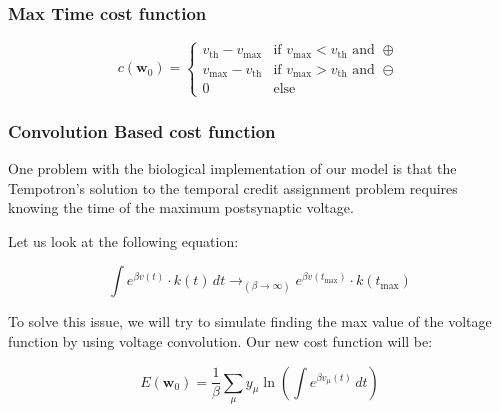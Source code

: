 \subsubsection{Max Time cost function}

\begin{equation}
    c(\mathbf{w}_0) = \begin{cases}
    v_{\text{th}} - v_{\text{max}} & \text{if } v_{\text{max}} < v_{\text{th}} \text{ and } \oplus \\
    v_{\text{max}} - v_{\text{th}} & \text{if } v_{\text{max}} > v_{\text{th}} \text{ and } \ominus \\
    0 & \text{else}
    \end{cases}
\end{equation}

\subsubsection{Convolution Based cost function}

One problem with the biological implementation of our model is that the Tempotron’s solution to the temporal credit assignment problem requires knowing the time of the maximum postsynaptic voltage.

Let us look at the following equation:

\begin{equation}
    \int e^{\beta v(t)} \cdot k(t) \, dt \rightarrow_{(\beta \rightarrow \infty)} e^{\beta v(t_{\text{max}})} \cdot k(t_{\text{max}})
\end{equation}

To solve this issue, we will try to simulate finding the max value of the voltage function by using voltage convolution. Our new cost function will be:

\begin{equation}
    E(\mathbf{w}_0) = \frac{1}{\beta} \sum_{\mu} y_{\mu} \ln\left(\int e^{\beta v_{\mu}(t)} \, dt\right)
\end{equation}
